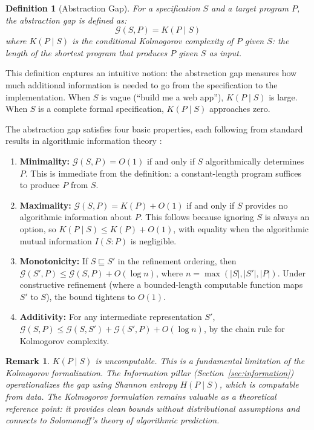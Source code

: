 \documentclass[11pt, a4paper]{googledeepmind}
\newtheorem{definition}{Definition}[section]
\newtheorem*{remark}{Remark}
\begin{document}
\begin{definition}[Abstraction Gap]
\label{def:abstraction-gap}
For a specification $S$ and a target program $P$, the \emph{abstraction gap} is defined as:
\begin{equation}
    \mathcal{G}(S, P) = K(P \mid S)
\end{equation}
where $K(P \mid S)$ is the conditional Kolmogorov complexity of $P$ given $S$: the length of the shortest program that produces $P$ given $S$ as input.
\end{definition}

This definition captures an intuitive notion: the abstraction gap measures how much additional information is needed to go from the specification to the implementation. When $S$ is vague (``build me a web app''), $K(P \mid S)$ is large. When $S$ is a complete formal specification, $K(P \mid S)$ approaches zero.

The abstraction gap satisfies four basic properties, each following from standard results in algorithmic information theory \citep{li2019introduction}:

\begin{enumerate}[label=(\alph*)]
    \item \textbf{Minimality:} $\mathcal{G}(S, P) = O(1)$ if and only if $S$ algorithmically determines $P$. This is immediate from the definition: a constant-length program suffices to produce $P$ from $S$.
    \item \textbf{Maximality:} $\mathcal{G}(S, P) = K(P) + O(1)$ if and only if $S$ provides no algorithmic information about $P$. This follows because ignoring $S$ is always an option, so $K(P \mid S) \leq K(P) + O(1)$, with equality when the algorithmic mutual information $I(S : P)$ is negligible.
    \item \textbf{Monotonicity:} If $S \sqsubseteq S'$ in the refinement ordering, then $\mathcal{G}(S', P) \leq \mathcal{G}(S, P) + O(\log n)$, where $n = \max(|S|, |S'|, |P|)$. Under constructive refinement (where a bounded-length computable function maps $S'$ to $S$), the bound tightens to $O(1)$.
    \item \textbf{Additivity:} For any intermediate representation $S'$, $\mathcal{G}(S, P) \leq \mathcal{G}(S, S') + \mathcal{G}(S', P) + O(\log n)$, by the chain rule for Kolmogorov complexity.
\end{enumerate}

\begin{remark}
$K(P \mid S)$ is uncomputable. This is a fundamental limitation of the Kolmogorov formalization. The Information pillar (Section~\ref{sec:information}) operationalizes the gap using Shannon entropy $H(P \mid S)$, which is computable from data. The Kolmogorov formulation remains valuable as a theoretical reference point: it provides clean bounds without distributional assumptions and connects to Solomonoff's theory of algorithmic prediction.
\end{remark}
\end{document}

